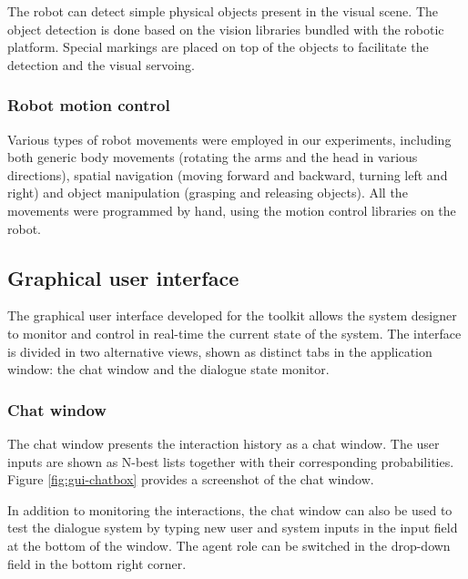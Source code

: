 The robot can detect simple physical objects present in the visual scene. The object detection is done based on the vision libraries bundled with the robotic platform. Special markings are placed on top of the objects 
to facilitate the detection and the visual servoing. 

\subsubsection*{Robot motion control}

Various types of robot movements were employed in our experiments, including both generic body movements (rotating the arms and the head in various directions), spatial navigation (moving forward and backward, turning left and right) and object manipulation (grasping and releasing objects).  All the movements were programmed by hand, using the motion control libraries on the robot. 

\subsection{Graphical user interface}

The graphical user interface developed for the \opendial toolkit allows the system designer to monitor and control in real-time the current state of the system.  The interface is divided in two alternative views, shown as distinct tabs in the application window: the chat window and the dialogue state monitor.

\subsubsection*{Chat window}
The chat window presents the interaction history as a chat window.  The user inputs are shown as N-best lists together with their corresponding probabilities.  Figure \ref{fig:gui-chatbox} provides a screenshot of the chat window. 

In addition to monitoring the interactions, the chat window can also be used to test the dialogue system by typing new user and system inputs in the input field at the bottom of the window.  The agent role can be switched in the drop-down field in the bottom right corner. 

